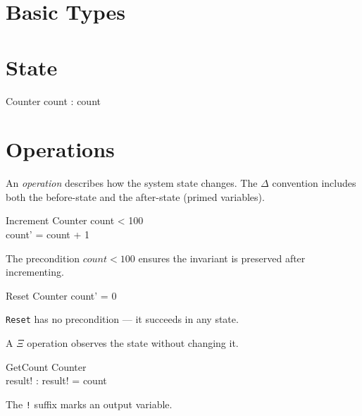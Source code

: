 \documentclass{article}
\begin{document}
\section{Basic Types}

\begin{zed}
  [NAME]
\end{zed}

\section{State}

\begin{schema}{Counter}
  count : \nat
\where
  count 
\end{schema}

\section{Operations}

An \emph{operation} describes how the system state changes.
The $\Delta$ convention includes both the before-state
and the after-state (primed variables).

\begin{schema}{Increment}
  \Delta Counter
\where
  count < 100 \\
  count' = count + 1
\end{schema}

The precondition $count < 100$ ensures the invariant is
preserved after incrementing.

\begin{schema}{Reset}
  \Delta Counter
\where
  count' = 0
\end{schema}

\texttt{Reset} has no precondition --- it succeeds in any state.

A $\Xi$ operation observes the state without changing it.

\begin{schema}{GetCount}
  \Xi Counter \\
  result! : \nat
\where
  result! = count
\end{schema}

The \texttt{!} suffix marks an output variable.
\end{document}
